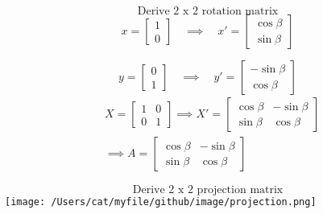 \documentclass{article}
\begin{document}
\[ \text{Derive 2 x 2 rotation matrix}\]
\[
 x = \begin{bmatrix}
    1\\
    0 
    \end{bmatrix} \quad \implies \quad
 x'   = \left[
    \begin{array}{c}
      \cos\beta\\
      \sin\beta
      \end{array}
    \right]
\]

\[
 y = \begin{bmatrix}
    0\\
    1 
    \end{bmatrix} \quad \implies \quad
 y'   = \left[
    \begin{array}{c}
      -\sin\beta\\
      \cos\beta
      \end{array}
    \right]
\]
\begin{equation}
\begin{aligned}
& X = \begin{bmatrix}
    1 & 0\\
    0 & 1
\end{bmatrix} \implies
X' = \begin{bmatrix}
    \cos\beta & -\sin\beta\\
    \sin\beta & \cos\beta
\end{bmatrix}\\
& \implies A = 
    \begin{bmatrix}
        \cos\beta & -\sin\beta\\
        \sin\beta & \cos\beta
    \end{bmatrix}
\end{aligned}
\end{equation}

\pagebreak
\[ \text{Derive 2 x 2 projection matrix}\]
\texttt{[image: /Users/cat/myfile/github/image/projection.png]}
\end{document}
